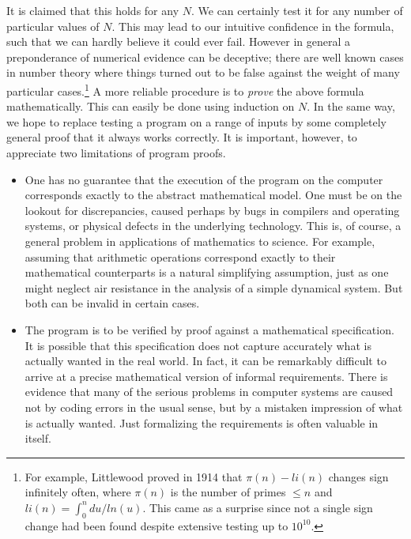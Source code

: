 It is claimed that this holds for any $N$. We can certainly test it for any
number of particular values of $N$. This may lead to our intuitive confidence
in the formula, such that we can hardly believe it could ever fail. However in
general a preponderance of numerical evidence can be deceptive; there are well
known cases in number theory where things turned out to be false against the
weight of many particular cases.\footnote{For example, Littlewood proved in
1914 that $\pi(n) - li(n)$ changes sign infinitely often, where $\pi(n)$ is the
number of primes $\leq n$ and $li(n) = \int_0^n du / ln(u)$. This came as a
surprise since not a single sign change had been found despite extensive
testing up to $10^{10}$.} A more reliable procedure is to {\em prove} the above
formula mathematically. This can easily be done using induction on $N$. In the
same way, we hope to replace testing a program on a range of inputs by some
completely general proof that it always works correctly. It is important,
however, to appreciate two limitations of program proofs.

\begin{itemize}

\item One has no guarantee that the execution of the program on the computer
corresponds exactly to the abstract mathematical model. One must be on the
lookout for discrepancies, caused perhaps by bugs in compilers and operating
systems, or physical defects in the underlying technology. This is, of course,
a general problem in applications of mathematics to science. For example,
assuming that arithmetic operations correspond exactly to their mathematical
counterparts is a natural simplifying assumption, just as one might neglect air
resistance in the analysis of a simple dynamical system. But both can be
invalid in certain cases.

\item The program is to be verified by proof against a mathematical
specification. It is possible that this specification does not capture
accurately what is actually wanted in the real world. In fact, it can be
remarkably difficult to arrive at a precise mathematical version of informal
requirements. There is evidence that many of the serious problems in computer
systems are caused not by coding errors in the usual sense, but by a mistaken
impression of what is actually wanted. Just formalizing the requirements is
often valuable in itself.

\end{itemize}

